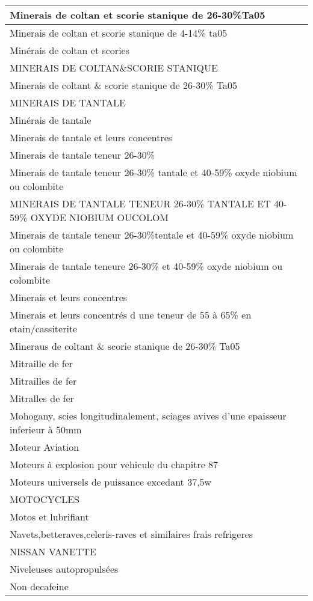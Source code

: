 \documentclass[
]{book}
\begin{document}
\begin{table}
\begin{tabular}[t]{l}
\hline
Minerais de coltan et scorie stanique de 26-30\%Ta05\\
\hline
Minerais de coltan et scorie stanique de 4-14\% ta05\\
\hline
Minérais de coltan et scories\\
\hline
MINERAIS DE COLTAN\&SCORIE STANIQUE\\
\hline
Minerais de coltant \& scorie stanique de 26-30\% Ta05\\
\hline
MINERAIS DE TANTALE\\
\hline
Minérais de tantale\\
\hline
Minerais de tantale et leurs concentres\\
\hline
Minerais de tantale teneur 26-30\%\\
\hline
Minerais de tantale teneur 26-30\% tantale et 40-59\% oxyde niobium ou colombite\\
\hline
MINERAIS DE TANTALE TENEUR 26-30\% TANTALE ET 40-59\% OXYDE NIOBIUM OUCOLOM\\
\hline
Minerais de tantale teneur 26-30\%tentale et 40-59\% oxyde niobium ou colombite\\
\hline
Minerais de tantale teneure 26-30\% et 40-59\% oxyde niobium ou colombite\\
\hline
Minerais et leurs concentres\\
\hline
Minerais et leurs concentrés d une teneur de 55 à 65\% en etain/cassiterite\\
\hline
Mineraus de coltant \& scorie stanique de 26-30\% Ta05\\
\hline
Mitraille de fer\\
\hline
Mitrailles de fer\\
\hline
Mitralles de fer\\
\hline
Mohogany, scies longitudinalement, sciages avives d'une epaisseur inferieur à 50mm\\
\hline
Moteur Aviation\\
\hline
Moteurs à explosion pour vehicule du chapitre 87\\
\hline
Moteurs universels de puissance excedant 37,5w\\
\hline
MOTOCYCLES\\
\hline
Motos et lubrifiant\\
\hline
Navets,betteraves,celeris-raves et similaires frais refrigeres\\
\hline
NISSAN VANETTE\\
\hline
Niveleuses autopropulsées\\
\hline
Non decafeine\\

\end{tabular}
\end{table}
\end{document}
